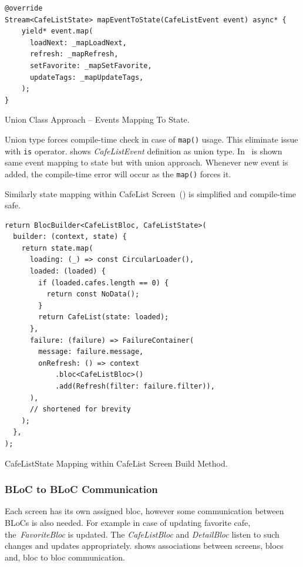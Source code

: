 \begin{listing}[ht]
\begin{verbatim}
@override
Stream<CafeListState> mapEventToState(CafeListEvent event) async* {
    yield* event.map(
      loadNext: _mapLoadNext,
      refresh: _mapRefresh,
      setFavorite: _mapSetFavorite,
      updateTags: _mapUpdateTags,
    );
}
\end{verbatim}
\caption{Union Class Approach -- Events Mapping To State.}
\label{listing:ct-event-union-usage}
\end{listing}

Union type forces compile-time check in case of \verb|map()| usage. This eliminate issue with \verb|is| operator.  shows \textit{CafeListEvent} definition as union type. In~ is shown same event mapping to state but with union approach. Whenever new event is added, the compile-time error will occur as the \verb|map()| forces it.

Similarly state mapping within CafeList Screen~() is simplified and compile-time safe. 

\begin{listing}[ht!]
\begin{verbatim}
return BlocBuilder<CafeListBloc, CafeListState>(
  builder: (context, state) {
    return state.map(
      loading: (_) => const CircularLoader(),
      loaded: (loaded) {
        if (loaded.cafes.length == 0) {
          return const NoData();
        }
        return CafeList(state: loaded);
      },
      failure: (failure) => FailureContainer(
        message: failure.message,
        onRefresh: () => context
            .bloc<CafeListBloc>()
            .add(Refresh(filter: failure.filter)),
      ),
      // shortened for brevity
    );
  },
);
\end{verbatim}
\caption{CafeListState Mapping within CafeList Screen Build Method.}
\label{listing:ct-state-cafe-list-union-usage}
\end{listing}

\subsubsection{BLoC to BLoC Communication}
Each screen has its own assigned \gls{bloc}, however some communication between BLoCs is also needed. For example in case of updating favorite cafe, the~\textit{FavoriteBloc} is updated. The\textit{ CafeListBloc} and \textit{DetailBloc} listen to such changes and updates appropriately.  shows associations between screens, blocs and, bloc to bloc communication.


